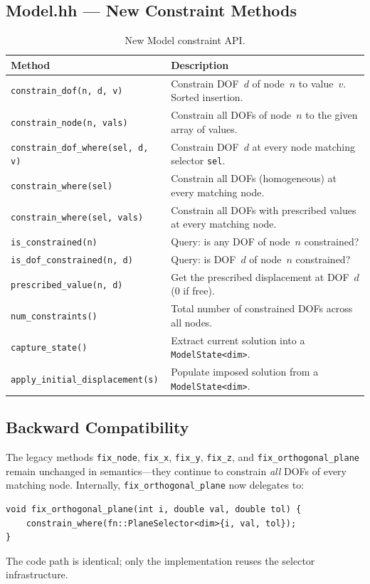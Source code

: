 \subsection{Model.hh — New Constraint Methods}

\begin{table}[ht]
\centering\small
\caption{New Model constraint API.}
\label{tab:constraint-api}
\begin{tabular}{lp{7.5cm}}
\toprule
\textbf{Method} & \textbf{Description} \\
\midrule
\texttt{constrain\_dof(n, d, v)}
  & Constrain DOF~$d$ of node~$n$ to value~$v$.  Sorted insertion. \\
\texttt{constrain\_node(n, vals)}
  & Constrain all DOFs of node~$n$ to the given array of values. \\
\texttt{constrain\_dof\_where(sel, d, v)}
  & Constrain DOF~$d$ at every node matching selector \texttt{sel}. \\
\texttt{constrain\_where(sel)}
  & Constrain all DOFs (homogeneous) at every matching node. \\
\texttt{constrain\_where(sel, vals)}
  & Constrain all DOFs with prescribed values at every matching node. \\
\midrule
\texttt{is\_constrained(n)}
  & Query: is any DOF of node~$n$ constrained? \\
\texttt{is\_dof\_constrained(n, d)}
  & Query: is DOF~$d$ of node~$n$ constrained? \\
\texttt{prescribed\_value(n, d)}
  & Get the prescribed displacement at DOF~$d$ (0 if free). \\
\texttt{num\_constraints()}
  & Total number of constrained DOFs across all nodes. \\
\midrule
\texttt{capture\_state()}
  & Extract current solution into a \texttt{ModelState<dim>}. \\
\texttt{apply\_initial\_displacement(s)}
  & Populate imposed solution from a \texttt{ModelState<dim>}. \\
\bottomrule
\end{tabular}
\end{table}


\subsection{Backward Compatibility}

The legacy methods \texttt{fix\_node}, \texttt{fix\_x}, \texttt{fix\_y},
\texttt{fix\_z}, and \texttt{fix\_orthogonal\_plane} remain unchanged in
semantics---they continue to constrain \emph{all} DOFs of every matching
node.  Internally, \texttt{fix\_orthogonal\_plane} now delegates to:
\begin{lstlisting}
void fix_orthogonal_plane(int i, double val, double tol) {
    constrain_where(fn::PlaneSelector<dim>{i, val, tol});
}
\end{lstlisting}
The code path is identical; only the implementation reuses the selector
infrastructure.


